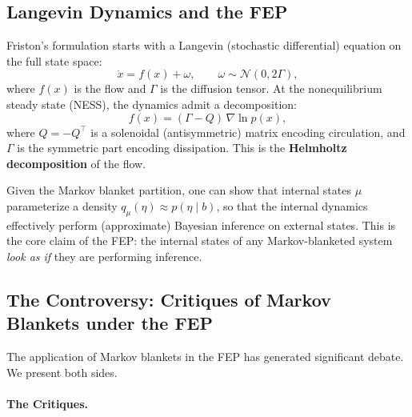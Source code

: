 \documentclass[11pt,a4paper]{article}
\theoremstyle{definition}
\begin{document}
\subsection{Langevin Dynamics and the FEP}

Friston's formulation starts with a Langevin (stochastic differential) equation
on the full state space:
\begin{equation}
  \dot{x} = f(x) + \omega, \qquad \omega \sim \mathcal{N}(0, 2\Gamma),
  \label{eq:langevin}
\end{equation}
where $f(x)$ is the flow and $\Gamma$ is the diffusion tensor.  At the
nonequilibrium steady state (NESS), the dynamics admit a decomposition:
\begin{equation}
  f(x) = (\Gamma - Q)\, \nabla \ln p(x),
\end{equation}
where $Q = -Q^\top$ is a solenoidal (antisymmetric) matrix encoding
circulation, and $\Gamma$ is the symmetric part encoding dissipation.  This is
the \textbf{Helmholtz decomposition} of the flow.

Given the Markov blanket partition, one can show that internal states
$\mu$ parameterize a density $q_\mu(\eta) \approx p(\eta \mid b)$, so that the
internal dynamics effectively perform (approximate) Bayesian inference on
external states.  This is the core claim of the FEP: the internal states of any
Markov-blanketed system \emph{look as if} they are performing inference.

\subsection{The Controversy: Critiques of Markov Blankets under the FEP}
\label{sec:mb_controversy}

The application of Markov blankets in the FEP has generated significant
debate.  We present both sides.

\paragraph{The Critiques.}
\end{document}
